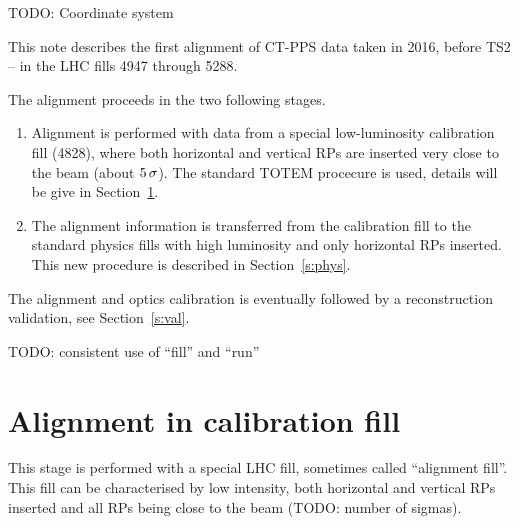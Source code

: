\documentclass[TOTEM]{cern/cernphprep}
\def\un#1{\,{\rm #1}}
\def\TODO#1{{\color{red}TODO: #1}}
\def\hang{\hangindent=\parindent}
\def\>{\par\vskip\itskip\parindent\itindent\indent\hang\llap{\hbox to3mm{$\bullet$\hss}}}
\def\>E{\par\vskip\itskip\parindent\itindent\indent\hang\llap{\hbox to3mm{\hss}}}
\def\>>{\par\vskip\iitskip\parindent\iitindent\indent\hang\llap{\hbox to\iitindent{\hss--\ }}}
\begin{document}
\> \TODO{Coordinate system}

This note describes the first alignment of CT-PPS data taken in 2016, before TS2 -- in the LHC fills 4947 through 5288. 

The alignment proceeds in the two following stages.
\begin{enumerate}[noitemsep]
\item Alignment is performed with data from a special low-luminosity calibration fill (4828), where both horizontal and vertical RPs are inserted very close to the beam (about $5\un{\sigma}$). The standard TOTEM procecure \cite{totem-ijmp} is used, details will be give in Section~\ref{s:calib}.
\item The alignment information is transferred from the calibration fill to the standard physics fills with high luminosity and only horizontal RPs inserted. This new procedure is described in Section~\ref{s:phys}.
\end{enumerate}

The alignment and optics calibration \cite{optics_calibration} is eventually followed by a reconstruction validation, see Section~\ref{s:val}.

\> \TODO{consistent use of ``fill'' and ``run''}


\section{Alignment in calibration fill}
\label{s:calib}

This stage is performed with a special LHC fill, sometimes called ``alignment fill''. This fill can be characterised by low intensity, both horizontal and vertical RPs inserted and all RPs being close to the beam (\TODO{number of sigmas}).
\end{document}
